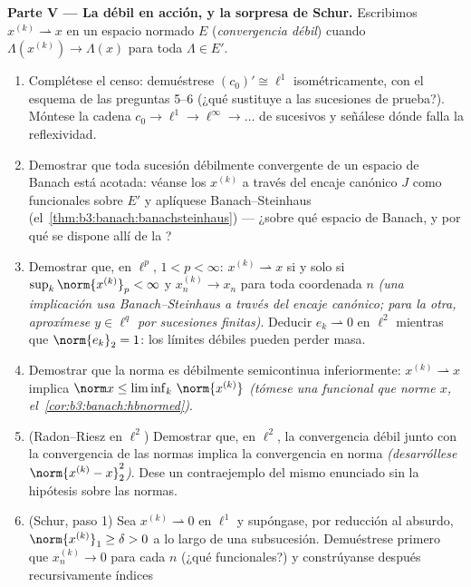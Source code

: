 \begin{problem}[{Problema de fin de semana --- $(\ell^p)' = \ell^q$,
reflexividad y la rareza de $\ell^\infty$}]
\medskip
\noindent\textbf{Parte V --- La
 débil en acción, y la
sorpresa de Schur.} Escribimos $x^{(k)} \rightharpoonup x$ en un espacio
normado $E$ (\emph{convergencia débil}) cuando
$\Lambda(x^{(k)}) \to \Lambda(x)$ para toda $\Lambda \in E'$.
\begin{enumerate}[resume]
  \item Complétese el censo:
  demuéstrese $(c_0)' \cong \ell^1$ isométricamente, con el esquema de
  las preguntas 5--6 (¿qué sustituye a las sucesiones de prueba?).
  Móntese la cadena $c_0 \to \ell^1 \to \ell^\infty \to \dots$ de
   sucesivos y señálese dónde
  falla la reflexividad. \item Demostrar que toda sucesión débilmente
  convergente de un espacio de Banach está acotada: véanse los $x^{(k)}$
  a través del encaje canónico $J$ como funcionales sobre $E'$ y
  aplíquese Banach--Steinhaus (el~\cref{thm:b3:banach:banachsteinhaus})
  --- ¿sobre qué espacio de Banach, y por qué se dispone allí de la
  ? \item Demostrar que,
  en $\ell^p$, $1 < p < \infty$: $x^{(k)}
        \rightharpoonup x$ si y solo si $\sup_k\norm{x^{(k)}}_p <
        \infty$ y $x^{(k)}_n \to x_n$ para toda coordenada $n$
  \emph{(una implicación usa Banach--Steinhaus a través del encaje
  canónico; para la otra, aproxímese $y
        \in \ell^q$ por sucesiones finitas)}. Deducir $e_k
        \rightharpoonup 0$ en $\ell^2$ mientras que $\norm{e_k}_2 =
        1$: los límites débiles pueden perder masa. \item Demostrar que
  la norma es débilmente semicontinua inferiormente:
  $x^{(k)} \rightharpoonup x$ implica $\norm x \leq
        \liminf_k\,\norm{x^{(k)}}$ \emph{(tómese una funcional que norme
  $x$, el~\cref{cor:b3:banach:hbnormed})}. \item (Radon--Riesz en
  $\ell^2$) Demostrar que, en $\ell^2$, la convergencia débil junto con
  la convergencia de las normas implica la convergencia en norma
  \emph{(desarróllese $\norm{x^{(k)} -
        x}_2^2$)}. Dese un contraejemplo del mismo enunciado sin la
  hipótesis sobre las normas. \item (Schur, paso 1) Sea
  $x^{(k)} \rightharpoonup 0$ en $\ell^1$ y supóngase, por reducción al
  absurdo, $\norm{x^{(k)}}_1 \geq \delta > 0$ a lo largo de una
  subsucesión. Demuéstrese primero que $x^{(k)}_n \to 0$ para cada $n$
  (¿qué funcionales?) y constrúyanse después recursivamente índices

\end{enumerate}
\end{problem}
